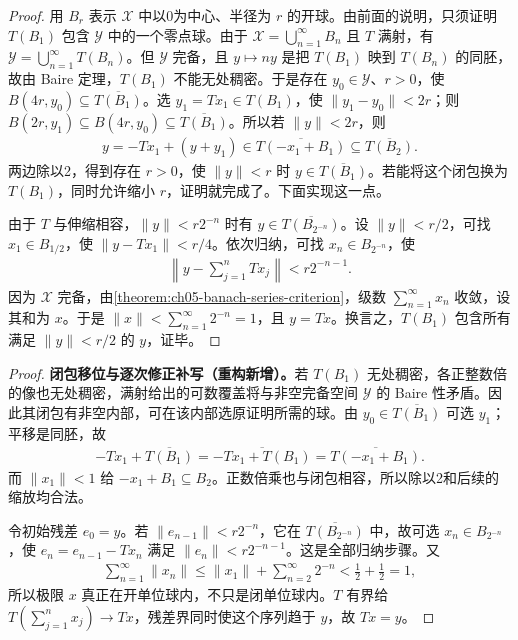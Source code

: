 \documentclass[../../main.tex]{subfiles}
\begin{document}
\begin{proof}
用 $B_r$ 表示 $\mathcal X$ 中以0为中心、半径为 $r$ 的开球。由前面的说明，只须证明 $T(B_1)$ 包含 $\mathcal Y$ 中的一个零点球。由于 $\mathcal X=\bigcup_{n=1}^{\infty}B_n$ 且 $T$ 满射，有 $\mathcal Y=\bigcup_{n=1}^{\infty}T(B_n)$。但 $\mathcal Y$ 完备，且 $y\mapsto ny$ 是把 $T(B_1)$ 映到 $T(B_n)$ 的同胚，故由 Baire 定理，$T(B_1)$ 不能无处稠密。于是存在 $y_0\in\mathcal Y$、$r>0$，使 $B(4r,y_0)\subseteq\overline{T(B_1)}$。选 $y_1=Tx_1\in T(B_1)$，使 $\|y_1-y_0\|<2r$；则 $B(2r,y_1)\subseteq B(4r,y_0)\subseteq\overline{T(B_1)}$。所以若 $\|y\|<2r$，则
\begin{align*}
y=-Tx_1+(y+y_1)\in\overline{T(-x_1+B_1)}\subseteq\overline{T(B_2)}.
\end{align*}
两边除以2，得到存在 $r>0$，使 $\|y\|<r$ 时 $y\in\overline{T(B_1)}$。若能将这个闭包换为 $T(B_1)$，同时允许缩小 $r$，证明就完成了。下面实现这一点。

由于 $T$ 与伸缩相容，$\|y\|<r2^{-n}$ 时有 $y\in\overline{T(B_{2^{-n}})}$。设 $\|y\|<r/2$，可找 $x_1\in B_{1/2}$，使 $\|y-Tx_1\|<r/4$。依次归纳，可找 $x_n\in B_{2^{-n}}$，使
\begin{align*}
\left\|y-\sum_{j=1}^nTx_j\right\|<r2^{-n-1}.
\end{align*}
因为 $\mathcal X$ 完备，由\cref{theorem:ch05-banach-series-criterion}，级数 $\sum_{n=1}^{\infty}x_n$ 收敛，设其和为 $x$。于是 $\|x\|<\sum_{n=1}^{\infty}2^{-n}=1$，且 $y=Tx$。换言之，$T(B_1)$ 包含所有满足 $\|y\|<r/2$ 的 $y$，证毕。
\end{proof}
\begin{proof}
\textbf{闭包移位与逐次修正补写（重构新增）。}若 $T(B_1)$ 无处稠密，各正整数倍的像也无处稠密，满射给出的可数覆盖将与非空完备空间 $\mathcal Y$ 的 Baire 性矛盾。因此其闭包有非空内部，可在该内部选原证明所需的球。由 $y_0\in\overline{T(B_1)}$ 可选 $y_1$；平移是同胚，故
\begin{align*}
-Tx_1+\overline{T(B_1)}=\overline{-Tx_1+T(B_1)}=\overline{T(-x_1+B_1)}.
\end{align*}
而 $\|x_1\|<1$ 给 $-x_1+B_1\subseteq B_2$。正数倍乘也与闭包相容，所以除以2和后续的缩放均合法。

令初始残差 $e_0=y$。若 $\|e_{n-1}\|<r2^{-n}$，它在 $\overline{T(B_{2^{-n}})}$ 中，故可选 $x_n\in B_{2^{-n}}$，使 $e_n=e_{n-1}-Tx_n$ 满足 $\|e_n\|<r2^{-n-1}$。这是全部归纳步骤。又
\begin{align*}
\sum_{n=1}^{\infty}\|x_n\|\le\|x_1\|+\sum_{n=2}^{\infty}2^{-n}<\tfrac12+\tfrac12=1,
\end{align*}
所以极限 $x$ 真正在开单位球内，不只是闭单位球内。$T$ 有界给 $T(\sum_{j=1}^nx_j)\to Tx$，残差界同时使这个序列趋于 $y$，故 $Tx=y$。
\end{proof}
\end{document}
